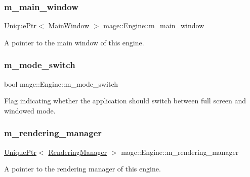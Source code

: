 \subsubsection{\texorpdfstring{m\+\_\+main\+\_\+window}{m\_main\_window}}
{\footnotesize\ttfamily \hyperlink{namespacemage_a3316d7143a973e37adf1110f2e80ca31}{Unique\+Ptr}$<$ \hyperlink{classmage_1_1_main_window}{Main\+Window} $>$ mage\+::\+Engine\+::m\+\_\+main\+\_\+window\hspace{0.3cm}{\ttfamily [private]}}

A pointer to the main window of this engine. \hypertarget{classmage_1_1_engine_aa5cb2e0b7bb2c4a9020e79ab832ee221}{}\label{classmage_1_1_engine_aa5cb2e0b7bb2c4a9020e79ab832ee221} 
\subsubsection{\texorpdfstring{m\+\_\+mode\+\_\+switch}{m\_mode\_switch}}
{\footnotesize\ttfamily bool mage\+::\+Engine\+::m\+\_\+mode\+\_\+switch\hspace{0.3cm}{\ttfamily [private]}}

Flag indicating whether the application should switch between full screen and windowed mode. \hypertarget{classmage_1_1_engine_a81c7475c3501f84f9bd9c7bbeaebfcb6}{}\label{classmage_1_1_engine_a81c7475c3501f84f9bd9c7bbeaebfcb6} 
\subsubsection{\texorpdfstring{m\+\_\+rendering\+\_\+manager}{m\_rendering\_manager}}
{\footnotesize\ttfamily \hyperlink{namespacemage_a3316d7143a973e37adf1110f2e80ca31}{Unique\+Ptr}$<$ \hyperlink{classmage_1_1_rendering_manager}{Rendering\+Manager} $>$ mage\+::\+Engine\+::m\+\_\+rendering\+\_\+manager\hspace{0.3cm}{\ttfamily [private]}}

A pointer to the rendering manager of this engine. \hypertarget{classmage_1_1_engine_ac8d94579e72983a99a78be6b9b606a28}{}\label{classmage_1_1_engine_ac8d94579e72983a99a78be6b9b606a28} 

